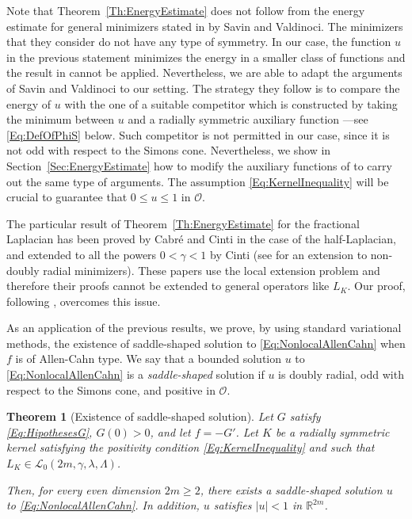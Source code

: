 \documentclass[12pt,reqno]{amsart}
\newtheorem{theorem}{Theorem}[section]
\theoremstyle{definition}
\theoremstyle{remark}
\newcommand{\con}[1]{\mathbb{#1}}
\newcommand{\R}{\con{R}} %
\newcommand{\lcal}{\mathcal{L}}
\newcommand{\ocal}{\mathcal{O}}
\newcommand{\s}{\gamma}
\numberwithin{equation}{section}
\begin{document}
	Note that Theorem~\ref{Th:EnergyEstimate} does not follow from the energy estimate for general minimizers stated in \cite{SavinValdinoci-EnergyEstimate} by Savin and Valdinoci. The minimizers that they consider do not have any type of symmetry. In our case, the function $u$ in the previous statement minimizes the energy in a smaller class of functions and the result in \cite{SavinValdinoci-EnergyEstimate} cannot be applied. Nevertheless, we are able to adapt the arguments of Savin and Valdinoci to our setting.  The strategy they follow is to compare the energy of $u$ with the one of a suitable competitor which is constructed by taking the minimum between $u$ and a radially symmetric auxiliary function ---see \eqref{Eq:DefOfPhiS} below. Such competitor is not permitted in our case, since it is not odd with respect to the Simons cone. Nevertheless, we show in Section~\ref{Sec:EnergyEstimate} how to modify the auxiliary functions of \cite{SavinValdinoci-EnergyEstimate} to carry out the same type of arguments. The assumption \eqref{Eq:KernelInequality} will be crucial to guarantee that $0\leq u \leq 1$ in $\ocal$.
	
	The particular result of Theorem~\ref{Th:EnergyEstimate} for the fractional Laplacian has been proved by Cabré and Cinti \cite{CabreCinti-EnergyHalfL} in the case of the half-Laplacian, and extended to all the powers $0<\s<1$ by Cinti \cite{Cinti-Saddle2} (see \cite{CabreCinti-SharpEnergy} for an extension to non-doubly radial minimizers). These papers use the local extension problem and therefore their proofs cannot be extended to general operators like $L_K$. Our proof, following \cite{SavinValdinoci-EnergyEstimate}, overcomes this issue.
	
	
	As an application of the previous results, we prove, by using standard variational methods, the existence of saddle-shaped solution to \eqref{Eq:NonlocalAllenCahn} when $f$ is of Allen-Cahn type. We say that a bounded solution $u$ to \eqref{Eq:NonlocalAllenCahn} is a \emph{saddle-shaped} solution if $u$ is doubly radial, odd with respect to the Simons cone, and positive in $\ocal$. 
	
	\begin{theorem}[Existence of saddle-shaped solution]
		\label{Th:Existence}
		Let $G$ satisfy \eqref{Eq:HipothesesG}, $G(0)>0$, and let $f=-G'$. Let $K$ be a radially symmetric kernel satisfying the positivity condition \eqref{Eq:KernelInequality} and such that $L_K\in \lcal_0(2m, \s, \lambda, \Lambda)$. 
		
		Then, for every even dimension $2m \geq 2$, there exists a saddle-shaped solution $u$ to \eqref{Eq:NonlocalAllenCahn}. In addition, $u$ satisfies $|u|<1$ in $\R^{2m}$.
	\end{theorem}
	
\end{document}
